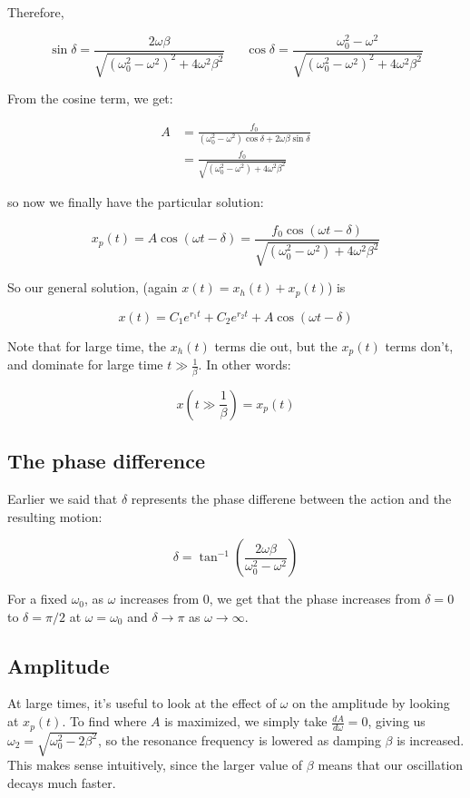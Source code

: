 Therefore, 

\[ \sin \delta = \frac{2\omega \beta}{\sqrt{(\omega_0^2 - \omega^2)^2 + 4\omega^2 \beta^2}} \phantom{aaa} \cos \delta = \frac{\omega_0^2 - \omega^2}{\sqrt{(\omega_0^2 - \omega^2)^2 + 4\omega^2 \beta^2}}\]

From the cosine term, we get: 

\begin{align*}
    A &= \frac{f_0}{(\omega_0^2 - \omega^2)\cos \delta + 2\omega \beta \sin \delta}\\
    &= \frac{f_0}{\sqrt{(\omega_0^2 - \omega^2) + 4\omega^2 \beta^2}}
\end{align*}

so now we finally have the particular solution: 

\[ x_p(t) = A\cos(\omega t - \delta) = \frac{f_0 \cos (\omega t - \delta)}{\sqrt{(\omega_0^2 - \omega^2) + 4\omega^2 \beta^2}}\]

So our general solution, (again $x(t) = x_h(t) + x_p(t)$) is

\[ x(t) = C_1e^{r_1t} + C_2e^{r_2t} + A\cos(\omega t - \delta)\] 

Note that for large time, the $x_h(t)$ terms die out, but the $x_p(t)$ terms don't, and dominate for large time $t \gg \frac 1 \beta$. In other words: 

\[ x(t \gg \frac{1}{\beta}) = x_p(t)\] 

\subsection{The phase difference}

Earlier we said that $\delta$ represents the phase differene between the action and the resulting motion: 

\[ \delta = \tan^{-1}\left(\frac{2\omega \beta}{\omega_0^2 - \omega^2}\right)\] 

For a fixed $\omega_0$, as $\omega$ increases from 0, we get that the phase increases from $\delta = 0$ to $\delta = \pi/2$ at $\omega = \omega_0$ and $\delta \to \pi$ as $\omega \to \infty$.

\subsection{Amplitude} 

At large times, it's useful to look at the effect of $\omega$ on the amplitude by looking at $x_p(t)$. To find where $A$ is maximized, we simply take $\frac{dA}{d\omega} = 0$, giving us $\omega_2 = \sqrt{\omega_0^2 - 2\beta^2}$, so the resonance frequency is lowered as damping $\beta$ is increased. This makes sense intuitively, since the larger value of $\beta$ means that our oscillation decays much faster. 

